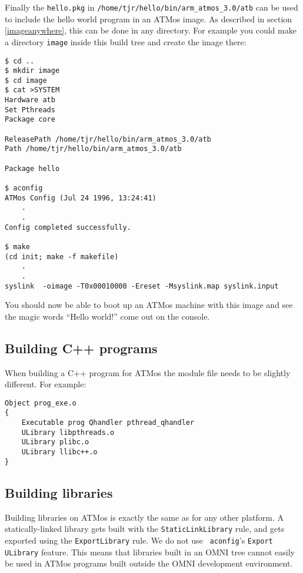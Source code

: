 \documentclass[11pt,twoside,onecolumn]{article}
\begin{document}
Finally the {\tt hello.pkg} in \verb|/home/tjr/hello/bin/arm_atmos_3.0/atb| can
be used to include the hello world program in an ATMos image.  As described in
section \ref{imageanywhere}, this can be done in any directory.  For example
you could make a directory {\tt image} inside this build tree and create the
image there:

{\footnotesize \begin{verbatim}
$ cd ..
$ mkdir image
$ cd image
$ cat >SYSTEM
Hardware atb
Set Pthreads
Package core

ReleasePath /home/tjr/hello/bin/arm_atmos_3.0/atb
Path /home/tjr/hello/bin/arm_atmos_3.0/atb

Package hello

$ aconfig
ATMos Config (Jul 24 1996, 13:24:41)
    .
    .
Config completed successfully.

$ make
(cd init; make -f makefile)
    .
    .
syslink  -oimage -T0x00010000 -Ereset -Msyslink.map syslink.input

\end{verbatim}}

You should now be able to boot up an ATMos machine with this image and see the
magic words ``Hello world!'' come out on the console.

\subsection{Building C++ programs}

When building a C++ program for ATMos the module file needs to be slightly
different.  For example:

{\footnotesize \begin{verbatim}
Object prog_exe.o
{
    Executable prog Qhandler pthread_qhandler
    ULibrary libpthreads.o
    ULibrary plibc.o
    ULibrary llibc++.o
}
\end{verbatim}}

\subsection{Building libraries}

Building libraries on ATMos is exactly the same as for any other platform.  A
statically-linked library gets built with the \verb|StaticLinkLibrary| rule,
and gets exported using the \verb|ExportLibrary| rule.  We do not use {\tt
aconfig}'s {\tt Export ULibrary} feature.  This means that libraries built in
an OMNI tree cannot easily be used in ATMos programs built outside the OMNI
development environment.
\end{document}
